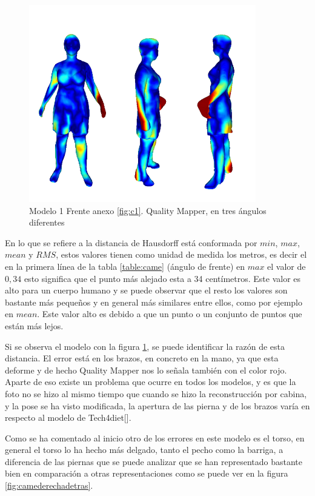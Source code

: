 \begin{figure}[H]
	\centering
	\includegraphics[scale=0.6]{imagenes/cameliafrente.png}
	\caption{Modelo 1 Frente anexo \ref{fig:c1}. Quality Mapper, en tres ángulos diferentes}
	\label{fig:camedelante}
\end{figure}


En lo que se refiere a la distancia de Hausdorff está conformada por $min$, $max$, $mean$ y $RMS$, estos valores tienen como unidad de medida los metros, es decir el en la primera línea de la tabla \ref{table:came} (ángulo de frente) en $max$ el valor de $0,34$ esto significa que el punto más alejado esta a 34 centímetros.
Este valor es alto para un cuerpo humano y se puede observar que el resto los valores son bastante más pequeños y en general más similares entre ellos, como por ejemplo en $mean$. Este valor alto es debido a que un punto o un conjunto de puntos que están más lejos. 

Si se observa el modelo con la figura \ref{fig:camedelante}, se puede identificar la razón de esta distancia. El error está en los brazos, en concreto en la mano, ya que esta deforme y de hecho Quality Mapper nos lo señala también con el color rojo. Aparte de eso existe un problema que ocurre en todos los modelos, y es que la foto no se hizo al mismo tiempo que cuando se hizo la reconstrucción por cabina, y la pose se ha visto modificada, la apertura de las pierna y de los brazos varía en respecto al modelo de Tech4diet[\cite{tech}].

Como se ha comentado al inicio otro de los errores en este modelo es el torso, en general el torso lo ha hecho más delgado, tanto el pecho como la barriga, a diferencia de las piernas que se puede analizar que se han representado bastante bien en comparación a otras representaciones como se puede ver en la figura \ref{fig:camederechadetras}.

